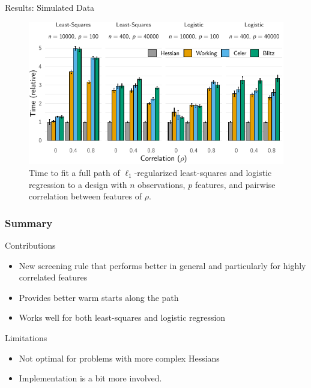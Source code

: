 \documentclass[10pt]{beamer}
\begin{document}
\begin{frame}{Results: Simulated Data}
  \begin{figure}
    \centering
    \includegraphics{figures/paper3-simulateddata-timings}
    \caption{
      Time to fit a full path of \(\ell_1\)-regularized least-squares and
      logistic regression to a design with \(n\) observations, \(p\) features, and pairwise
      correlation between features of \(\rho\).
    }
  \end{figure}
\end{frame}

\begin{frame}[c]
  \frametitle{Summary}
  \begin{exampleblock}{Contributions}
    \begin{itemize}
      \item New screening rule that performs better in general and particularly for highly correlated
            features
      \item Provides better warm starts along the path
      \item Works well for both least-squares and logistic regression
    \end{itemize}
  \end{exampleblock}

  \pause
  \begin{alertblock}{Limitations}
    \begin{itemize}
      \item Not optimal for problems with more complex Hessians
      \item Implementation is a bit more involved.
    \end{itemize}
  \end{alertblock}
\end{frame}
\end{document}
